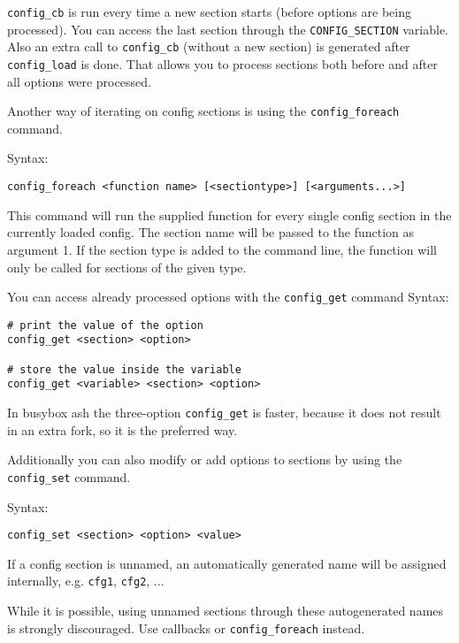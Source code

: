 \texttt{config\_cb} is run every time a new section starts (before options are being
processed). You can access the last section through the \texttt{CONFIG\_SECTION}
variable. Also an extra call to \texttt{config\_cb} (without a new section) is generated
after \texttt{config\_load} is done.
That allows you to process sections both before and after all options were
processed.

Another way of iterating on config sections is using the \texttt{config\_foreach} command.

Syntax:
\begin{Verbatim}
config_foreach <function name> [<sectiontype>] [<arguments...>]
\end{Verbatim}

This command will run the supplied function for every single config section in the currently
loaded config. The section name will be passed to the function as argument 1.
If the section type is added to the command line, the function will only be called for
sections of the given type.


You can access already processed options with the \texttt{config\_get} command
Syntax:

\begin{Verbatim}
# print the value of the option
config_get <section> <option>

# store the value inside the variable
config_get <variable> <section> <option>
\end{Verbatim}

In busybox ash the three-option \texttt{config\_get} is faster, because it does not
result in an extra fork, so it is the preferred way.

Additionally you can also modify or add options to sections by using the
\texttt{config\_set} command.

Syntax:

\begin{Verbatim}
config_set <section> <option> <value>
\end{Verbatim}

If a config section is unnamed, an automatically generated name will
be assigned internally, e.g. \texttt{cfg1}, \texttt{cfg2}, ...

While it is possible, using unnamed sections through these autogenerated names is
strongly discouraged. Use callbacks or \texttt{config\_foreach} instead.

